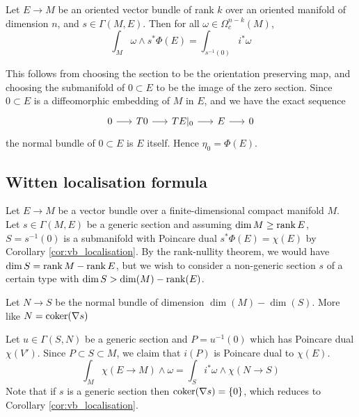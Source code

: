 \begin{cor} \label{cor:vb_localisation}
	Let $E\to M$ be an oriented vector bundle of rank $k$ over an oriented 
	manifold of dimension $n$, 
	and $s\in\Gamma(M,E)$.
	Then for all $\omega\in \Omega^{n-k}_c(M)$,
	 \[
	\int_M \omega \wedge s^* \Phi(E) =\int_{s^{-1}(0)} i^*\omega  
	\] 
\end{cor}

This follows from choosing the section to be the orientation preserving map, and
choosing the submanifold of $0\subset E$ to be the image of the zero section.
Since $0\subset E$ is a diffeomorphic embedding of $M$ in $E$, and we have the
exact sequence
\[
	\begin{tikzcd}[column sep = 1.6em]
		0 \arrow[r] & T0 \arrow[r] & TE|_0 \arrow[r] 
						& E \arrow[r] & 0
	\end{tikzcd}
	\]
the normal bundle of  $0\subset E$ is  $E$ itself.
Hence $\eta_0 = \Phi(E)$. 

\subsection{Witten localisation formula}
Let $E\to M$ be a vector bundle over a finite-dimensional compact manifold  $M$.
Let $s\in\Gamma(M,E)$ be a generic section and assuming $\dim M \geq \operatorname{rank} E$, 
$S=s^{-1}(0)$ is a submanifold with
Poincare dual $s^*\Phi(E)=\chi(E)$ by Corollary \ref{cor:vb_localisation}. 
By the rank-nullity theorem, we would have $\dim S = \operatorname{rank} M - \operatorname{rank} E$, but 
we wish to consider a non-generic section $s$ of a certain type with 
$\dim S > \dim(M)-\operatorname{rank}(E)$. 



Let  $N\to S$ be the normal bundle of dimension
$\dim(M)-\dim(S)$.  More like $N = \operatorname{coker} (\nabla s)$

Let  $u\in\Gamma(S,N)$ be a generic section and
$P=u^{-1}(0)$ which has Poincare dual $\chi(V')$. Since  $P\subset S \subset M$,
we claim that $i(P)$ is Poincare dual to  $\chi(E)$.
\[
\int_M \chi(E\to M)\wedge \omega = \int_{S} i^*\omega \wedge \chi(N\to S)
\] 
Note that if $s$ is a generic section then  $\operatorname{coker} (\nabla s) = \{0\}$, which
reduces to Corollary \ref{cor:vb_localisation}.



